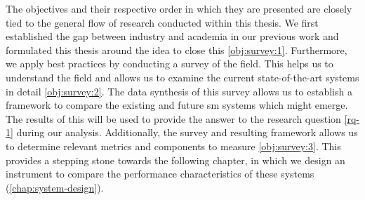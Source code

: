 The objectives and their respective order in which they are  presented are closely tied to the general flow of research conducted within this thesis. We first established the gap between industry and academia in our previous work and formulated this thesis around the idea to close this \ref{obj:survey:1}. Furthermore, we apply best practices by conducting a survey of the field. This helps us to understand the field and allows us to examine the current state-of-the-art systems in detail \ref{obj:survey:2}. The data synthesis of this survey allows us to establish a framework to compare the existing and future \gls{sm} systems which might emerge. The results of this will be used to provide the answer to the research question \ref{rq-1} during our analysis. Additionally, the survey and resulting framework allows us to determine relevant metrics and components to measure \ref{obj:survey:3}. This provides a stepping stone towards the following chapter, in which we design an instrument to compare the performance characteristics of these systems (\cref{chap:system-design}).